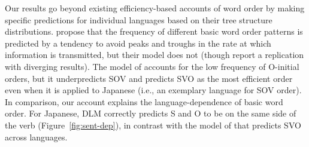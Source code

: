 \documentclass[9pt,twocolumn,twoside,lineno]{pnas-new}
\begin{document}
Our results go beyond existing efficiency-based accounts of word order by making specific predictions for individual languages based on their tree structure distributions.
\cite{maurits2010why} propose that the frequency of different basic word order patterns is predicted by a tendency to avoid peaks and troughs in the rate at which information is transmitted, but their model does not (though \cite{gonering-morgan-2020-processing} report a replication with diverging results).
The model of \cite{maurits2010why} accounts for the low frequency of O-initial orders, but it underpredicts SOV and predicts SVO as the most efficient order even when it is applied to Japanese (i.e., an exemplary language for SOV order).
In comparison, our account explains the language-dependence of basic word order.
For Japanese, DLM correctly predicts S and O to be on the same side of the verb (Figure~\ref{fig:sent-dep}), in contrast with the model of \cite{maurits2010why} that predicts SVO across languages. %


\end{document}
